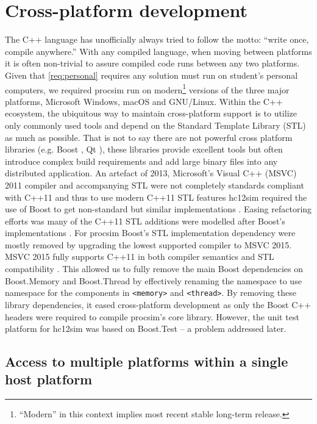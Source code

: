 \section{Cross-platform development}
\label{sec:cross-platform:sec:cross-platform-development}

The C++ language has unofficially always tried to follow the motto: ``write once, compile anywhere.'' With any compiled language, when moving between platforms it is often non-trivial to assure compiled code runs between any two platforms. Given that \cref{req:personal} requires any solution must run on student's personal computers, we required procsim run on modern\footnote{``Modern'' in this context implies most recent stable long-term release.} versions of the three major platforms, Microsoft Windows, macOS and GNU/Linux. Within the C++ ecosystem, the ubiquitous way to maintain cross-platform support is to utilize only commonly used tools and depend on the Standard Template Library (STL) as much as possible. That is not to say there are not powerful cross platform libraries (e.g. Boost \cite{Boost}, Qt \cite{Qt}), these libraries provide excellent tools but often introduce complex build requirements and add large binary files into any distributed application. An artefact of 2013, Microsoft's Visual C++ (MSVC) 2011 compiler and accompanying STL were not completely standards compliant with C++11 and thus to use modern C++11 STL features hc12sim required the use of Boost to get non-standard but similar implementations \cite{Microsoft:MSVC:ModernCPP:2011}. Easing refactoring efforts was many of the C++11 STL additions were modelled after Boost's implementations \cite{Meyers2005}. For procsim Boost's STL implementation dependency were mostly removed by upgrading the lowest supported compiler to MSVC 2015. MSVC 2015 fully supports C++11 in both compiler semantics and STL compatibility \cite{Microsoft:MSVC:ModernCPP}. This allowed us to fully remove the main Boost dependencies on Boost.Memory and Boost.Thread by effectively renaming the  namespace to use  namespace for the components in \texttt{<memory>} and \texttt{<thread>}. By removing these library dependencies, it eased cross-platform development as only the Boost C++ headers were required to compile procsim's core library. However, the unit test platform for hc12sim was based on Boost.Test \cite{Boost1.53.0:Test} -- a problem addressed later.

\subsection{Access to multiple platforms within a single host platform}

